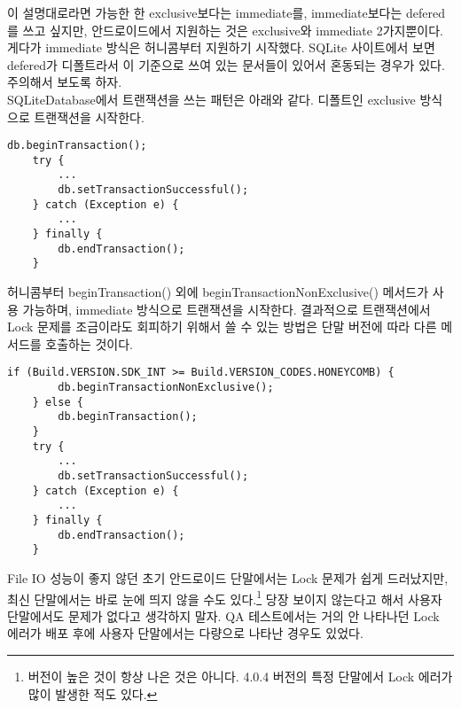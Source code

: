 이 설명대로라면 가능한 한 exclusive보다는 immediate를, immediate보다는 defered를 쓰고 싶지만, 
안드로이드에서 지원하는 것은 exclusive와 immediate 2가지뿐이다. 게다가 immediate 방식은 허니콤부터 지원하기 시작했다.
SQLite 사이트에서 보면 defered가 디폴트라서 이 기준으로 쓰여 있는 문서들이 있어서 혼동되는 경우가 있다. 주의해서 보도록 하자.\\

SQLiteDatabase에서 트랜잭션을 쓰는 패턴은 아래와 같다. 
디폴트인 exclusive 방식으로 트랜잭션을 시작한다.
\begin{lstlisting}[frame=single] 
	db.beginTransaction();
   	try {
     	...
     	db.setTransactionSuccessful();
	} catch (Exception e) {
		...
   	} finally {
     	db.endTransaction();
   	}
\end{lstlisting}

허니콤부터 beginTransaction() 외에 beginTransactionNonExclusive() 메서드가 사용 가능하며, immediate 방식으로 트랜잭션을 시작한다.
결과적으로 트랜잭션에서 Lock 문제를 조금이라도 회피하기 위해서 쓸 수 있는 방법은 단말 버전에 따라 다른 메서드를 호출하는 것이다.
\begin{lstlisting}[frame=single] 
	if (Build.VERSION.SDK_INT >= Build.VERSION_CODES.HONEYCOMB) {
		db.beginTransactionNonExclusive();
	} else {
		db.beginTransaction();
	}
   	try {
     	...
     	db.setTransactionSuccessful();
	} catch (Exception e) {
		...
   	} finally {
     	db.endTransaction();
   	}
\end{lstlisting}

File IO 성능이 좋지 않던 초기 안드로이드 단말에서는 Lock 문제가 쉽게 드러났지만, 최신 단말에서는 바로 눈에 띄지 않을 수도 있다.\footnote{버전이 높은 것이 항상 나은 것은 아니다. 4.0.4 버전의 특정 단말에서 Lock 에러가 많이 발생한 적도 있다.} 당장 보이지 않는다고 해서 사용자 단말에서도 문제가 없다고 생각하지 말자. QA 테스트에서는 거의 안 나타나던 Lock 에러가 배포 후에 사용자 단말에서는 다량으로 나타난 경우도 있었다.\\

